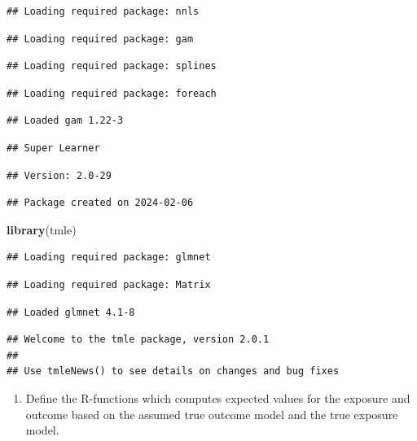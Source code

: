 \documentclass[
]{book}
\newenvironment{Shaded}{\begin{snugshade}}{\end{snugshade}}
\newcommand{\FunctionTok}[1]{\textcolor[rgb]{0.13,0.29,0.53}{\textbf{#1}}}
\newcommand{\NormalTok}[1]{#1}
\providecommand{\tightlist}{%
  \setlength{\itemsep}{0pt}\setlength{\parskip}{0pt}}
\begin{document}
\begin{verbatim}
## Loading required package: nnls
\end{verbatim}

\begin{verbatim}
## Loading required package: gam
\end{verbatim}

\begin{verbatim}
## Loading required package: splines
\end{verbatim}

\begin{verbatim}
## Loading required package: foreach
\end{verbatim}

\begin{verbatim}
## Loaded gam 1.22-3
\end{verbatim}

\begin{verbatim}
## Super Learner
\end{verbatim}

\begin{verbatim}
## Version: 2.0-29
\end{verbatim}

\begin{verbatim}
## Package created on 2024-02-06
\end{verbatim}

\begin{Shaded}
\begin{Highlighting}[]
\FunctionTok{library}\NormalTok{(tmle)}
\end{Highlighting}
\end{Shaded}

\begin{verbatim}
## Loading required package: glmnet
\end{verbatim}

\begin{verbatim}
## Loading required package: Matrix
\end{verbatim}

\begin{verbatim}
## Loaded glmnet 4.1-8
\end{verbatim}

\begin{verbatim}
## Welcome to the tmle package, version 2.0.1
## 
## Use tmleNews() to see details on changes and bug fixes
\end{verbatim}

\begin{enumerate}
\def\labelenumi{\arabic{enumi}.}
\setcounter{enumi}{1}
\tightlist
\item
  Define the R-functions which computes expected values
  for the exposure and outcome based on the assumed
  true outcome model and the true exposure model.
\end{enumerate}
\end{document}
